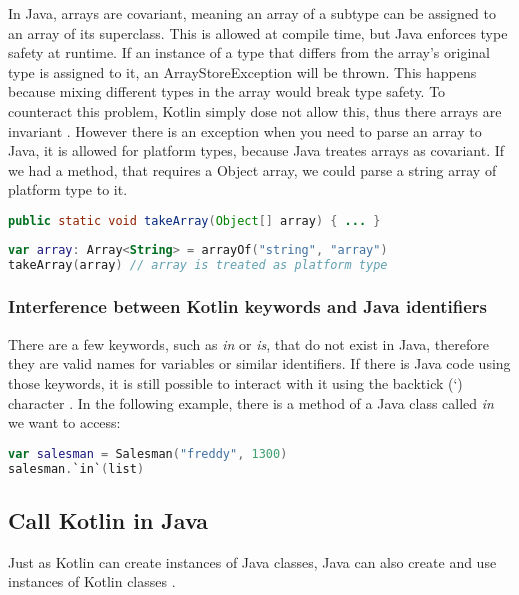 \documentclass[a4paper,11pt]{article}
\begin{document}
In Java, arrays are covariant, meaning an array of a subtype can be assigned to an array of its superclass. This is allowed at compile time, but Java enforces type safety at runtime. If an instance of a type that differs from the array's original type is assigned to it, an ArrayStoreException will be thrown. This happens because mixing different types in the array would break type safety. To counteract this problem, Kotlin simply dose not allow this, thus there arrays are invariant \cite{interop-arrays}. However there is an exception when you need to parse an array to Java, it is allowed for platform types, because Java treates arrays as covariant. If we had a method, that requires a Object array, we could parse a string array of platform type to it.
\begin{lstlisting}[language=Java]
public static void takeArray(Object[] array) { ... }
\end{lstlisting}
\begin{lstlisting}[language=Kotlin]
var array: Array<String> = arrayOf("string", "array")
takeArray(array) // array is treated as platform type
\end{lstlisting}

\subsubsection{Interference between Kotlin keywords and Java identifiers}
There are a few keywords, such as \textit{in} or \textit{is}, that do not exist in Java, therefore they are valid names for variables or similar identifiers. If there is Java code using those keywords, it is still possible to interact with it using the backtick (`) character \cite{interop-escaping-identifiers}. In the following example, there is a method of a Java class called \textit{in} we want to access:
\begin{lstlisting}[language=Kotlin]
var salesman = Salesman("freddy", 1300)
salesman.`in`(list)
\end{lstlisting}

\subsection{Call Kotlin in Java}
Just as Kotlin can create instances of Java classes, Java can also create and use instances of Kotlin classes \cite{interop-java}.
\end{document}
